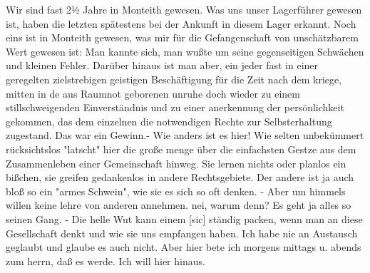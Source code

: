 \def\day{14. Mai 1944.}
\mktitle
Wir sind fast 2½ Jahre in Monteith gewesen.
Was uns unser Lagerf\"{u}hrer gewesen ist, haben die letzten sp\"{a}testens bei der Ankunft in diesem Lager erkannt.
Noch eins ist in Monteith gewesen, was mir f\"{u}r die Gefangenschaft von unsch\"{a}tzbarem Wert gewesen ist: Man kannte sich, man wu{\ss}te um seine gegenseitigen Schw\"{a}chen und kleinen Fehler.
Dar\"{u}ber hinaus ist man aber, ein jeder fast in einer geregelten zielstrebigen geistigen Besch\"{a}ftigung f\"{u}r die Zeit nach dem kriege, mitten in de aus Raumnot geborenen unruhe doch wieder zu einem stillschweigenden Einverst\"{a}ndnis und zu einer anerkennung der pers\"{o}nlichkeit gekommen, das dem einzelnen die notwendigen Rechte zur Selbsterhaltung zugestand.
Das war ein Gewinn.-
Wie anders ist es hier!
Wie selten unbek\"{u}mmert r\"{u}cksichtslos "latscht" hier die gro{\ss}e menge \"{u}ber die einfachsten Gestze aus dem Zusammenleben einer Gemeinschaft hinweg.
Sie lernen nichts oder planlos ein bi{\ss}chen, sie greifen gedankenlos in andere Rechtsgebiete.
Der andere ist ja auch blo{\ss} so ein "armes Schwein", wie sie es sich so oft denken.
- Aber um himmels willen keine lehre von anderen annehmen.
nei, warum denn?
Es geht ja alles so seinen Gang. -
Die helle Wut kann einem{\color{red} [sic] } st\"{a}ndig packen, wenn man an diese Gesellschaft denkt und wie sie uns empfangen haben.
Ich habe nie an Austausch geglaubt und glaube es auch nicht.
Aber hier bete ich morgens mittags u. abends zum herrn, da{\ss} es werde.
Ich will hier hinaus.

\clearpage

